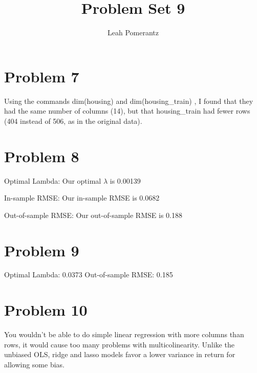 \documentclass{article}
\title{Problem Set 9}
\author{Leah Pomerantz}
\begin{document}
\maketitle

\section{Problem 7}

Using the commands
{\selectfont
dim(housing)
}and 
{\selectfont
dim(housing\_train)
},
I found that they had the same number of columns (14), but that 
{\selectfont
housing\_train
} had fewer rows (404 instead of 506, as in the original data).

\section{Problem 8}

Optimal Lambda: Our optimal $\lambda$ is 0.00139

In-sample RMSE: Our in-sample RMSE is 0.0682

Out-of-sample RMSE: Our out-of-sample RMSE is 0.188

\section{Problem 9}
Optimal Lambda: 0.0373
Out-of-sample RMSE: 0.185

\section{Problem 10}

You wouldn't be able to do simple linear regression with more columns than rows, it would cause too many problems with multicolinearity.
Unlike the unbiased OLS, ridge and lasso models favor a lower variance in return for allowing some bias.
\end{document}
